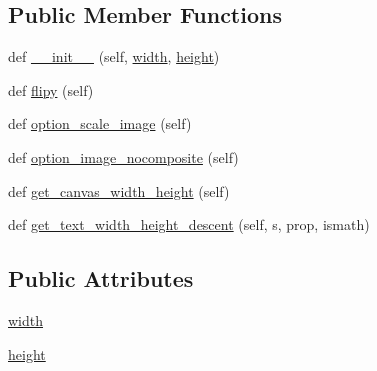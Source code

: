 \subsection*{Public Member Functions}
\begin{DoxyCompactItemize}
\item 
def \hyperlink{classmatplotlib_1_1backends_1_1__backend__pdf__ps_1_1RendererPDFPSBase_aeff4488f1e0e9270cf1d6803189a795c}{\+\_\+\+\_\+init\+\_\+\+\_\+} (self, \hyperlink{classmatplotlib_1_1backends_1_1__backend__pdf__ps_1_1RendererPDFPSBase_a55856d35dcfdf98307cb10fb3b1643ba}{width}, \hyperlink{classmatplotlib_1_1backends_1_1__backend__pdf__ps_1_1RendererPDFPSBase_a131284b65ec191c070a364d1e1118555}{height})
\item 
def \hyperlink{classmatplotlib_1_1backends_1_1__backend__pdf__ps_1_1RendererPDFPSBase_a331ac4fe44e81b4a745348b53ac5f0c7}{flipy} (self)
\item 
def \hyperlink{classmatplotlib_1_1backends_1_1__backend__pdf__ps_1_1RendererPDFPSBase_a89919f92a34d480cfc72dc02d79e919a}{option\+\_\+scale\+\_\+image} (self)
\item 
def \hyperlink{classmatplotlib_1_1backends_1_1__backend__pdf__ps_1_1RendererPDFPSBase_a680f7b171b697128ef9d84e0daf4cc8f}{option\+\_\+image\+\_\+nocomposite} (self)
\item 
def \hyperlink{classmatplotlib_1_1backends_1_1__backend__pdf__ps_1_1RendererPDFPSBase_a2e9ff4efcf1ff8eaccfb0fea598c4579}{get\+\_\+canvas\+\_\+width\+\_\+height} (self)
\item 
def \hyperlink{classmatplotlib_1_1backends_1_1__backend__pdf__ps_1_1RendererPDFPSBase_aefaa24b819895c890f5956a0fd6c1bd9}{get\+\_\+text\+\_\+width\+\_\+height\+\_\+descent} (self, s, prop, ismath)
\end{DoxyCompactItemize}
\subsection*{Public Attributes}
\begin{DoxyCompactItemize}
\item 
\hyperlink{classmatplotlib_1_1backends_1_1__backend__pdf__ps_1_1RendererPDFPSBase_a55856d35dcfdf98307cb10fb3b1643ba}{width}
\item 
\hyperlink{classmatplotlib_1_1backends_1_1__backend__pdf__ps_1_1RendererPDFPSBase_a131284b65ec191c070a364d1e1118555}{height}
\end{DoxyCompactItemize}


